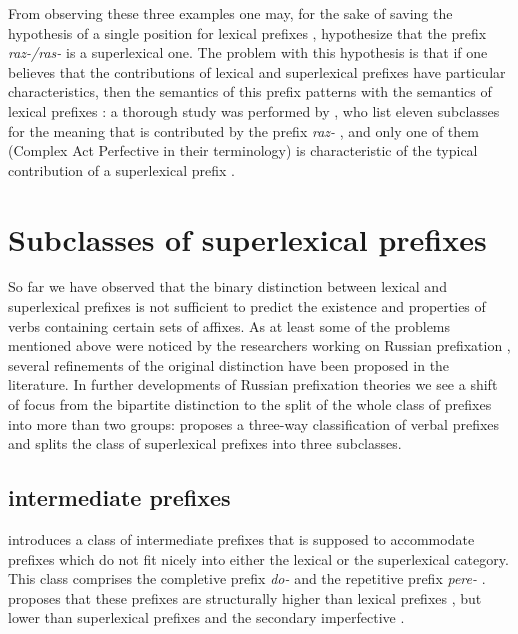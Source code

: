 From observing these three examples one may, for the sake of saving the hypothesis of a single position for lexical prefixes , hypothesize that the prefix \mbox{\textit{raz-/ras-}} is a superlexical one. The problem with this hypothesis is that if one believes that the contributions of lexical and superlexical prefixes  have particular characteristics, then the semantics of this prefix patterns with the semantics of lexical prefixes : a thorough study was performed by \citet{JandaNesset:10}, who list eleven subclasses for the meaning that is contributed by the prefix \textit{raz-} , and only one of them (Complex Act Perfective in their terminology) is characteristic of the typical contribution of a superlexical prefix .


\section{Subclasses of superlexical prefixes }\label{section:subclasses}
So far we have observed that the binary distinction between lexical and superlexical prefixes  is not sufficient to predict the existence and properties of verbs containing certain sets of affixes. As at least some of the problems mentioned above were noticed by the researchers working on Russian prefixation , several refinements of the original distinction have been proposed in the literature. In further developments of Russian prefixation  theories we see a shift of focus from the bipartite distinction to the split of the whole class of prefixes into more than two groups: \citet{Tatevosov:07} proposes a three-way classification  of verbal prefixes and \citet{Tatevosov:09} splits the class of superlexical prefixes  into three subclasses.

\subsection{intermediate prefixes }
\cite{Tatevosov:07} introduces a class of intermediate prefixes  that is supposed to accommodate prefixes which do not fit nicely into either the lexical or the superlexical category. This class comprises the completive  prefix \textit{do-}   and the repetitive  prefix \textit{pere-}  . \citet{Tatevosov:07} proposes that these prefixes are structurally higher than lexical prefixes , but lower than superlexical prefixes  and the secondary imperfective . 


